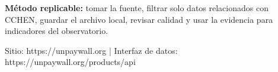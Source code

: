 \documentclass[9pt,a4paper]{extarticle}
\begin{document}
\vspace{0.06cm}
\begin{tcolorbox}[enhanced,colback=white,colframe=cchenpurple!55,boxrule=0.45pt,arc=2pt,left=6pt,right=6pt,top=5pt,bottom=5pt]
{\bfseries\color{cchenpurple}Método replicable:} tomar la fuente, filtrar solo datos relacionados con CCHEN, guardar el archivo local, revisar calidad y usar la evidencia para indicadores del observatorio.
\end{tcolorbox}

\vspace{0.02cm}
{\scriptsize\color{mutedgray}Sitio: https://unpaywall.org \quad | \quad Interfaz de datos: https://unpaywall.org/products/api}
\end{document}
